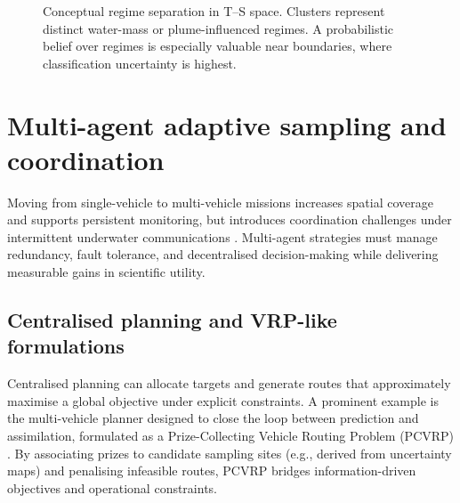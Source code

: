 \begin{figure}[t]
  \centering
  \caption{Conceptual regime separation in T--S space. Clusters represent distinct water-mass or plume-influenced regimes.
  A probabilistic belief over regimes is especially valuable near boundaries, where classification uncertainty is highest.}
  \label{fig:ts_regimes}
\end{figure}

\section{Multi-agent adaptive sampling and coordination} \label{sec:multi_agent}

Moving from single-vehicle to multi-vehicle missions increases spatial coverage and supports persistent monitoring, but introduces coordination challenges under intermittent underwater communications
\parencite{hwang2019auvreview,bernacchi2025closingloop,curtin2009aosn}. Multi-agent strategies must manage redundancy, fault tolerance, and decentralised decision-making while delivering measurable gains in scientific utility.

\subsection{Centralised planning and VRP-like formulations}
Centralised planning can allocate targets and generate routes that approximately maximise a global objective under explicit constraints.
A prominent example is the multi-vehicle planner designed to close the loop between prediction and assimilation, formulated as a Prize-Collecting Vehicle Routing Problem (PCVRP) \parencite{bernacchi2025closingloop}.
By associating prizes to candidate sampling sites (e.g., derived from uncertainty maps) and penalising infeasible routes, PCVRP bridges information-driven objectives and operational constraints.

